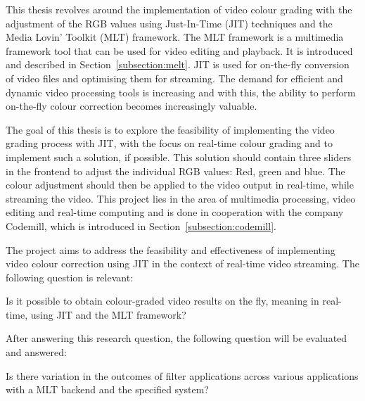 \documentclass[../MasterThesis.tex]{subfiles}
\begin{document}
	
	This thesis revolves around the implementation of video colour grading with the adjustment of the RGB values using Just-In-Time (JIT) techniques and the Media Lovin' Toolkit (MLT) framework. The MLT framework is a multimedia framework tool that can be used for video editing and playback. It is introduced and described in Section~\ref{subsection:melt}.
	JIT is used for on-the-fly conversion of video files and optimising them for streaming. 
	The demand for efficient and dynamic video processing tools is increasing and with this, the ability to perform on-the-fly colour correction becomes increasingly valuable. 
	
	
	The goal of this thesis is to explore the feasibility of implementing the video grading process with JIT, with the focus on real-time colour grading and to implement such a solution, if possible. This solution should contain three sliders in the frontend to adjust the individual RGB values: Red, green and blue. The colour adjustment should then be applied to the video output in real-time, while streaming the video.
	This project lies in the area of multimedia processing, video editing and real-time computing and is done in cooperation with the company Codemill, which is introduced in Section~\ref{subsection:codemill}.
	
	
	
	The project aims to address the feasibility and effectiveness of implementing video colour correction using JIT in the context of real-time video streaming. The following question is relevant:
	
	\begin{researchbox}
		Is it possible to obtain colour-graded video results on the fly, meaning in real-time, using JIT and the MLT framework?
	\end{researchbox}
	
	After answering this research question, the following question will be evaluated and answered:
	
	\begin{researchbox}
		Is there variation in the outcomes of filter applications across various applications with a MLT backend and the specified system?
	\end{researchbox}
\end{document}
